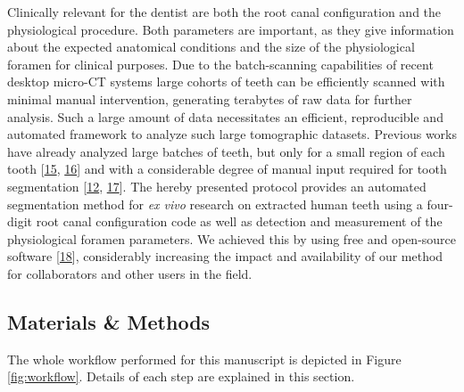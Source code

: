 \documentclass[
  american,
]{article}
\begin{document}
Clinically relevant for the dentist are both the root canal configuration and the physiological procedure.
Both parameters are important, as they give information about the expected anatomical conditions and the size of the physiological foramen for clinical purposes.
Due to the batch-scanning capabilities of recent desktop micro-CT systems large cohorts of teeth can be efficiently scanned with minimal manual intervention, generating terabytes of raw data for further analysis.
Such a large amount of data necessitates an efficient, reproducible and automated framework to analyze such large tomographic datasets.
Previous works have already analyzed large batches of teeth, but only for a small region of each tooth {[}\protect\hyperlink{ref-amSKhLb1}{15}, \protect\hyperlink{ref-DLVCfdzK}{16}{]} and with a considerable degree of manual input required for tooth segmentation {[}\protect\hyperlink{ref-OttTicsv}{12}, \protect\hyperlink{ref-ZTgDEakx}{17}{]}.
The hereby presented protocol provides an automated segmentation method for \emph{ex vivo} research on extracted human teeth using a four-digit root canal configuration code as well as detection and measurement of the physiological foramen parameters.
We achieved this by using free and open-source software {[}\protect\hyperlink{ref-11csWtgxP}{18}{]}, considerably increasing the impact and availability of our method for collaborators and other users in the field.

\hypertarget{materials-methods}{%
\subsection{Materials \& Methods}\label{materials-methods}}

The whole workflow performed for this manuscript is depicted in Figure \ref{fig:workflow}.
Details of each step are explained in this section.
\end{document}
